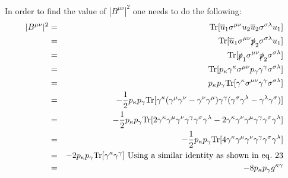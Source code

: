 \documentclass[12pt]{article}
\def \bea{\begin{eqnarray}}
\def \eea{\end{eqnarray}}
\def \Tr{{\rm Tr}}
\def \nn{\nonumber}
\def \nl{\nn \\}
\def \ou{\overline{u}}
\def \ga{\gamma}
\def \ka{\kappa}
\def \la{\lambda}
\def \si{\sigma}
\begin{document}
\begin{enumerate}
In order to find the value of $|B^{\mu\nu}|^2$ one needs to do the following:
\bea
|B^{\mu\nu}|^2 &=& \Tr[\ou_1 \si^{\mu\nu} u_2\ou_2 \si^{\si\la}u_1]\nl
&=& \Tr[\ou_1 \si^{\mu\nu}\slashed{p}_2 \si^{\si\la} u_1]\nl
&=& \Tr[\slashed{p}_1\si^{\mu\nu}\slashed{p}_2 \si^{\si\la}]\nl
&=& \Tr[p_\ka \ga^\ka \si^{\mu\nu}p_\ga \ga^\ga \si^{\si\la}]\nl
&=& p_\ka p_\ga \Tr[\ga^\ka \si^{\mu\nu}\ga^\ga \si^{\si\la}]\nl
&=& -\frac{1}{2} p_\ka p_\ga \Tr[\ga^\ka (\ga^\mu \ga^\nu - \ga^\nu \ga^\mu) \ga^\ga (\ga^\si \ga^\la - \ga^\la \ga^\si)]\nl
&=& -\frac{1}{2} p_\ka p_\ga \Tr[2\ga^\ka \ga^\mu \ga^\nu \ga^\ga \ga^\si \ga^\la  - 2\ga^\ka \ga^\nu \ga^\mu \ga^\ga \ga^\si \ga^\la]\nl
&=& -\frac{1}{2} p_\ka p_\ga \Tr[4\ga^\ka \ga^\mu \ga^\nu \ga^\ga \ga^\si \ga^\la]\nl
&=& -2p_\ka p_\ga \Tr[\ga^\ka \ga^\ga]~{\rm Using~ a~ similar~ identity~ as~ shown~ in~ eq.~ 23}\nl
&=& -8p_\ka p_\ga g^{\ka\ga}
\eea

\end{enumerate}
\end{document}
